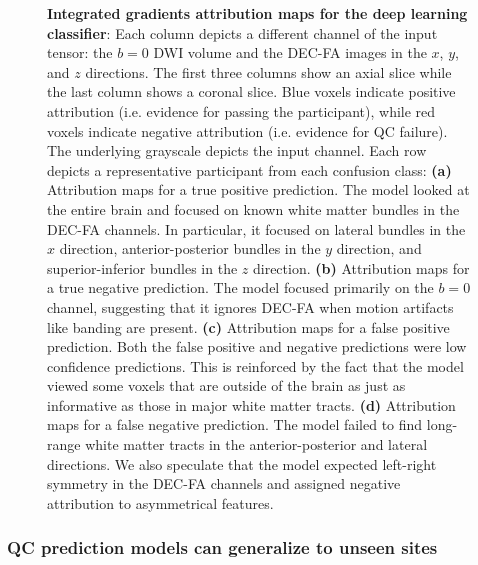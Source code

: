 \documentclass[9pt,lineno]{elife}
\begin{document}
\begin{figure}[tbp]
\begin{fullwidth}
\begin{subfigure}{\dimexpr\linewidth-3.5em\relax}
    \end{subfigure}
    \caption{%
        {\bf Integrated gradients attribution maps for the deep learning classifier}:
        Each column depicts a different channel of the input tensor: the $b=0$
        DWI volume and the DEC-FA images in the $x$, $y$, and $z$ directions.
        The first three columns show an axial slice while the last column
        shows a coronal slice. Blue voxels indicate positive attribution (i.e.
        evidence for passing the participant), while red voxels indicate negative
        attribution (i.e. evidence for QC failure). The underlying grayscale
        depicts the input channel. Each row depicts a representative participant
        from each confusion class:
        \textbf{(a)} Attribution maps for a true positive prediction. The model
        looked at the entire brain and focused on known white matter bundles in
        the DEC-FA channels. In particular, it focused on lateral bundles in the
        $x$ direction, anterior-posterior bundles in the $y$ direction, and
        superior-inferior bundles in the $z$ direction.
        \textbf{(b)} Attribution maps for a true negative prediction. The model
        focused primarily on the $b=0$ channel, suggesting that it ignores
        DEC-FA when motion artifacts like banding are present.
        \textbf{(c)} Attribution maps for a false positive prediction. Both the
        false positive and negative predictions were low confidence predictions.
        This is reinforced by the fact that the model viewed some voxels that are outside of the brain as just as informative as those in major white
        matter tracts.
        \textbf{(d)} Attribution maps for a false negative prediction. The model
        failed to find long-range white matter tracts in the anterior-posterior
        and lateral directions. We also speculate that the model expected
        left-right symmetry in the DEC-FA channels and assigned negative
        attribution to asymmetrical features. }
    \label{fig:ig}
\end{fullwidth}
\end{figure}

\subsubsection{QC prediction models can generalize to unseen sites}
\end{document}
